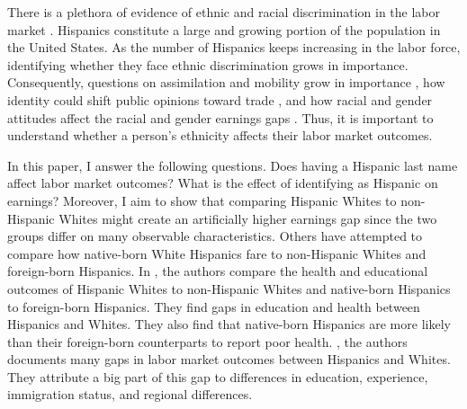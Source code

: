 \documentclass[12pt, fullpage]{article}
\begin{document}
There is a plethora of evidence of ethnic and racial discrimination in the labor market \citep{bayer2018divergent, charles2008prejudice, card1992school, fryer2004causes, rubinstein2014pride, bertrand2004emily, juhn1991accounting}. Hispanics constitute a large and growing portion of the population in the United States. As the number of Hispanics keeps increasing in the labor force, identifying whether they face ethnic discrimination grows in importance. Consequently, questions on assimilation and mobility grow in importance \citep{chettyUnitedStatesStill2014, chettyEffectsExposureBetter2016,chettyFadingAmericanDream2017,abramitzkyImmigrantsAssimilateMore2020a, abramitzkyNationImmigrantsAssimilation2014,abramitzkyCulturalAssimilationAge2016,chettyWhereLandOpportunity2014}, how identity could shift public opinions toward trade \citep{grossmanIdentityPoliticsTrade2021}, and how racial and gender attitudes affect the racial and gender earnings gaps \citep{charlesPrejudiceWagesEmpirical2008,charlesEffectsSexismAmerican2018}. Thus, it is important to understand whether a person's ethnicity affects their labor market outcomes.

In this paper, I answer the following questions. Does having a Hispanic last name affect labor market outcomes? What is the effect of identifying as Hispanic on earnings? Moreover, I aim to show that comparing Hispanic Whites to non-Hispanic Whites might create an artificially higher earnings gap since the two groups differ on many observable characteristics. Others have attempted to compare how native-born White Hispanics fare to non-Hispanic Whites and foreign-born Hispanics. In \citet{antman2020ethnic,antmanEthnicAttritionObserved2016,antmanEthnicAttritionObserved2016a,antmanEthnicAttritionAssimilation2020}, the authors compare the health and educational outcomes of Hispanic Whites to non-Hispanic Whites and native-born Hispanics to foreign-born Hispanics. They find gaps in education and health between Hispanics and Whites. They also find that native-born Hispanics are more likely than their foreign-born counterparts to report poor health. \citet{davilaChangesRelativeEarnings2008}, the authors documents many gaps in labor market outcomes between Hispanics and Whites. They attribute a big part of this gap to differences in education, experience, immigration status, and regional differences. 
\end{document}
